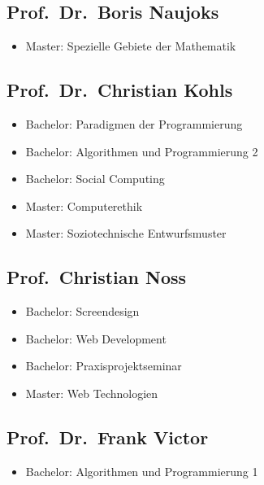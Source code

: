 \subsection{Prof.~Dr.~Boris Naujoks}\label{prof.dr.boris-naujoks}

\begin{itemize}
\tightlist
\item
  Master: Spezielle Gebiete der Mathematik
\end{itemize}

\subsection{Prof.~Dr.~Christian Kohls}\label{prof.dr.christian-kohls}

\begin{itemize}
\tightlist
\item
  Bachelor: Paradigmen der Programmierung
\item
  Bachelor: Algorithmen und Programmierung 2
\item
  Bachelor: Social Computing
\item
  Master: Computerethik
\item
  Master: Soziotechnische Entwurfsmuster
\end{itemize}

\subsection{Prof.~Christian Noss}\label{prof.christian-noss}

\begin{itemize}
\tightlist
\item
  Bachelor: Screendesign
\item
  Bachelor: Web Development
\item
  Bachelor: Praxisprojektseminar
\item
  Master: Web Technologien
\end{itemize}

\subsection{Prof.~Dr.~Frank Victor}\label{prof.dr.frank-victor}

\begin{itemize}
\tightlist
\item
  Bachelor: Algorithmen und Programmierung 1
\end{itemize}

